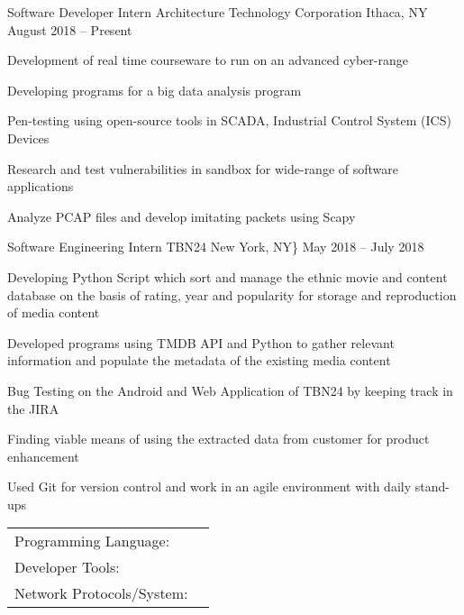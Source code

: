 \documentclass[]{awesome-cv}
\begin{document}
\vspace{-2mm}
\begin{cventries}
	\cventry
	{Software Developer Intern}
	{Architecture Technology Corporation}
	{Ithaca, NY}
	{August 2018 – Present}
	{\begin{cvitems}
		\item {Development of real time courseware to run on an advanced cyber-range}
		\item {Developing programs for a big data analysis program}
		\item {Pen-testing using open-source tools in SCADA, Industrial Control System (ICS) Devices}
		\item {Research and test vulnerabilities in sandbox for wide-range of software applications}
		\item {Analyze PCAP files and develop imitating packets using Scapy}
		\end{cvitems}}
	\cventry
	{Software Engineering Intern}
	{TBN24}
	{New York, NY\}}
	{May 2018 – July 2018}
	{\begin{cvitems}
		\item {Developing Python Script which sort and manage the ethnic movie and content database on the basis of rating, year and popularity for storage and reproduction of media content}
		\item {Developed programs using TMDB API and Python to gather relevant information and populate the metadata of the existing media content}
		\item {Bug Testing on the Android and Web Application of TBN24 by keeping track in the JIRA}
		\item {Finding viable means of using the extracted data from customer for product enhancement}
		\item {Used Git for version control and work in an agile environment with daily stand-ups}
		\end{cvitems}}
\end{cventries}
\begin{cventries}
	\cventry
	{}
	{\def\arraystretch{1.15}{\begin{tabular}{ l l }
		Programming Language:  & {\skill{ Python, Java, JavaScript, Bash, HTML5, React, Angular, C, C\#}} \\
		Developer Tools:  & {\skill{ Git, JIRA, Jetbrain\textquotesingle{}s IDE, Kali Linux, Bitbucket}} \\
		Network Protocols/System:  & {\skill{ ModBus, DNP3, TCP/IP, Supervisory Control and Data Acquisition (SCADA), VirtualBox}} \\
		\end{tabular}}}
	{}
	{}
	{}
\end{cventries}
\end{document}
